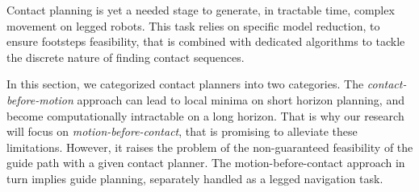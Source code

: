 



Contact planning is yet a needed stage to generate, in tractable time, complex movement on legged robots.
This task relies on specific model reduction, to ensure footsteps feasibility, that is combined with dedicated algorithms to tackle the discrete nature of finding contact sequences.

In this section, we categorized contact planners into two categories.
The \textit{contact-before-motion} approach can lead to local minima on short horizon planning, and become computationally intractable on a long horizon.
That is why our research will focus on \textit{motion-before-contact}, that is promising to alleviate these limitations.
However, it raises the problem of the non-guaranteed feasibility of the guide path with a given contact planner.
The motion-before-contact approach in turn implies guide planning, separately handled as a legged navigation task.


